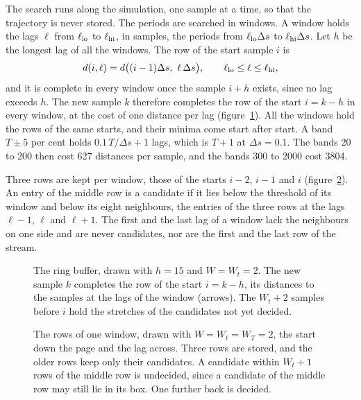 \documentclass[11pt]{article}
\begin{document}
The search runs along the simulation, one sample at a time, so that the trajectory is never stored. The periods are searched in windows. A window holds the lags $\ell$ from $\ell_{\rm lo}$ to $\ell_{\rm hi}$, in samples, the periods from $\ell_{\rm lo}\Delta s$ to $\ell_{\rm hi}\Delta s$. Let $h$ be the longest lag of all the windows. The row of the start sample $i$ is
\begin{equation}
d(i, \ell) = d\big((i - 1)\Delta s,\ \ell\,\Delta s\big), \qquad \ell_{\rm lo} \le \ell \le \ell_{\rm hi},
\end{equation}
and it is complete in every window once the sample $i + h$ exists, since no lag exceeds $h$. The new sample $k$ therefore completes the row of the start $i = k - h$ in every window, at the cost of one distance per lag (figure~\ref{fig:buffer}). All the windows hold the rows of the same starts, and their minima come start after start. A band $T \pm 5$ per cent holds $0.1\,T/\Delta s + 1$ lags, which is $T + 1$ at $\Delta s = 0.1$. The bands 20 to 200 then cost 627 distances per sample, and the bands 300 to 2000 cost 3804.

Three rows are kept per window, those of the starts $i - 2$, $i - 1$ and $i$ (figure~\ref{fig:rows}). An entry of the middle row is a candidate if it lies below the threshold of its window and below its eight neighbours, the entries of the three rows at the lags $\ell - 1$, $\ell$ and $\ell + 1$. The first and the last lag of a window lack the neighbours on one side and are never candidates, nor are the first and the last row of the stream.

\begin{figure}[t]
\centering
\resizebox{\textwidth}{!}{}
\caption{The ring buffer, drawn with $h = 15$ and $W = W_t = 2$. The new sample $k$ completes the row of the start $i = k - h$, its distances to the samples at the lags of the window (arrows). The $W_t + 2$ samples before $i$ hold the stretches of the candidates not yet decided.}
\label{fig:buffer}
\end{figure}

\begin{figure}[t]
\centering
\resizebox{0.9\textwidth}{!}{}
\caption{The rows of one window, drawn with $W = W_t = W_T = 2$, the start down the page and the lag across. Three rows are stored, and the older rows keep only their candidates. A candidate within $W_t + 1$ rows of the middle row is undecided, since a candidate of the middle row may still lie in its box. One further back is decided.}
\label{fig:rows}
\end{figure}
\end{document}
